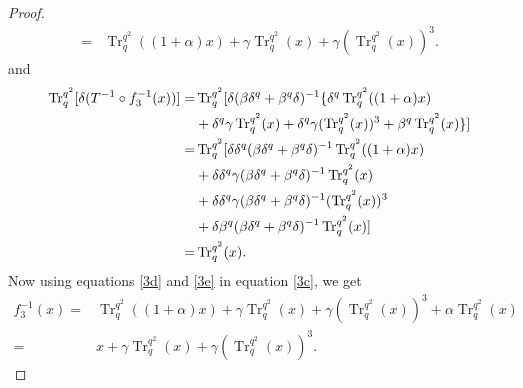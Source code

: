 \documentclass[10pt,a4paper]{amsart}
\begin{document}
\begin{proof}
\begin{align}
		=&\operatorname{Tr}_{q}^{q^2}((1+\alpha)x)+\gamma\operatorname{Tr}_{q}^{q^2}(x)+\gamma(\operatorname{Tr}_{q}^{q^2}(x))^3.\label{3d}
	\end{align}
	and
	\begin{align}
		\operatorname{Tr}_{q}^{q^2}[\delta (T^{-1}\circ f_3^{-1}(x))]=&\operatorname{Tr}_{q}^{q^2}[\delta (\beta\delta^{q}+\beta^{q}\delta)^{-1}\{\delta^{q}\operatorname{Tr}_{q}^{q^2}((1+\alpha)x)\notag\\&+\delta^{q}\gamma\operatorname{Tr}_{q}^{q^2}(x)+\delta^{q}\gamma(\operatorname{Tr}_{q}^{q^2}(x))^3+\beta^{q}\operatorname{Tr}_{q}^{q^2}(x)\}]\notag\\
		=&\operatorname{Tr}_{q}^{q^2}[\delta\delta^{q}(\beta\delta^{q}+\beta^{q}\delta)^{-1}\operatorname{Tr}_{q}^{q^2}((1+\alpha)x)\notag\\&+\delta\delta^{q}\gamma(\beta\delta^{q}+\beta^{q}\delta)^{-1}\operatorname{Tr}_{q}^{q^2}(x)\notag\\&+\delta\delta^{q}\gamma(\beta\delta^{q}+\beta^{q}\delta)^{-1}(\operatorname{Tr}_{q}^{q^2}(x))^3\notag\\&+\delta\beta^{q}(\beta\delta^{q}+\beta^{q}\delta)^{-1}\operatorname{Tr}_{q}^{q^2}(x)]\notag\\
		=&\operatorname{Tr}_{q}^{q^2}(x).\label{3e}
	\end{align}
	Now using equations \ref{3d} and \ref{3e} in equation \ref{3c}, we get
	\begin{align*}
		f_3^{-1}(x)=&\operatorname{Tr}_{q}^{q^2}((1+\alpha)x)+\gamma\operatorname{Tr}_{q}^{q^2}(x)+\gamma(\operatorname{Tr}_{q}^{q^2}(x))^3+\alpha\operatorname{Tr}_{q}^{q^2}(x)\\
		=&x+\gamma\operatorname{Tr}_{q}^{q^2}(x)+\gamma(\operatorname{Tr}_{q}^{q^2}(x))^3.
	\end{align*}
	

\end{proof}
\end{document}
